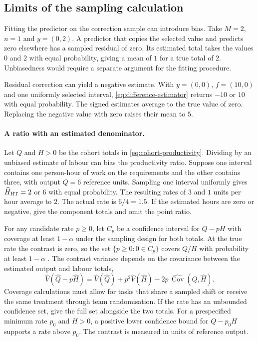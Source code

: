 \subsection{Limits of the sampling calculation}
\label{sec:difference-contract}

Fitting the predictor on the correction sample can introduce bias. Take $M=2$, $n=1$ and $y=(0,2)$. A predictor that copies the selected value and predicts zero elsewhere has a sampled residual of zero. Its estimated total takes the values $0$ and $2$ with equal probability, giving a mean of $1$ for a true total of $2$. Unbiasedness would require a separate argument for the fitting procedure.

Residual correction can yield a negative estimate. With $y=(0,0)$, $f=(10,0)$ and one uniformly selected interval, \eqref{eq:difference-estimator} returns $-10$ or $10$ with equal probability. The signed estimates average to the true value of zero. Replacing the negative value with zero raises their mean to $5$.

\paragraph{A ratio with an estimated denominator.}
Let $Q$ and $H>0$ be the cohort totals in \eqref{eq:cohort-productivity}. Dividing by an unbiased estimate of labour can bias the productivity ratio. Suppose one interval contains one person-hour of work on the requirements and the other contains three, with output $Q=6$ reference units. Sampling one interval uniformly gives $\widehat H_{\rm HT}=2$ or $6$ with equal probability. The resulting rates of $3$ and $1$ units per hour average to $2$. The actual rate is $6/4=1.5$. If the estimated hours are zero or negative, give the component totals and omit the point ratio.

For any candidate rate $p\geq0$, let $C_p$ be a confidence interval for $Q-pH$ with coverage at least $1-\alpha$ under the sampling design for both totals. At the true rate the contrast is zero, so the set $\{p\geq0:0\in C_p\}$ covers $Q/H$ with probability at least $1-\alpha$ \cite{vonluxburg2009}. The contrast variance depends on the covariance between the estimated output and labour totals,
\[
 \widehat V(\widehat Q-p\widehat H)
 =\widehat V(\widehat Q)+p^2\widehat V(\widehat H)
       -2p\,\widehat{\operatorname{Cov}}(\widehat Q,\widehat H).
\]
Coverage calculations must allow for tasks that share a sampled shift or receive the same treatment through team randomisation. If the rate has an unbounded confidence set, give the full set alongside the two totals. For a prespecified minimum rate $p_0$ and $H>0$, a positive lower confidence bound for $Q-p_0H$ supports a rate above $p_0$. The contrast is measured in units of reference output.

